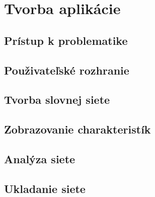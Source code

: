 \chapter{Tvorba aplikácie}\label{ch:appCreation}

\section{Prístup k problematike}\label{sec:pristupProblematika}

\section{Použivateľské rozhranie}\label{sec:pouzivatelskeRozhranie}	

\section{Tvorba slovnej siete}\label{sec:tvorbaSlovnaSiet}

\section{Zobrazovanie charakteristík}\label{sec:zobrazovanieCharakteristik}

\section{Analýza siete}\label{sec:analyzaSiete}

\section{Ukladanie siete}\label{sec:ukladanieSiete}